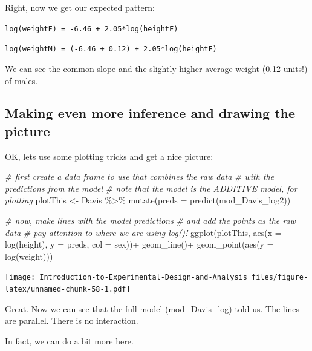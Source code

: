 \documentclass[
]{book}
\newenvironment{Shaded}{\begin{snugshade}}{\end{snugshade}}
\newcommand{\AttributeTok}[1]{\textcolor[rgb]{0.77,0.63,0.00}{#1}}
\newcommand{\CommentTok}[1]{\textcolor[rgb]{0.56,0.35,0.01}{\textit{#1}}}
\newcommand{\FunctionTok}[1]{\textcolor[rgb]{0.00,0.00,0.00}{#1}}
\newcommand{\NormalTok}[1]{#1}
\newcommand{\OtherTok}[1]{\textcolor[rgb]{0.56,0.35,0.01}{#1}}
\newcommand{\SpecialCharTok}[1]{\textcolor[rgb]{0.00,0.00,0.00}{#1}}
\begin{document}
Right, now we get our expected pattern:

\texttt{log(weightF)\ =\ -6.46\ +\ 2.05*log(heightF)}

\texttt{log(weightM)\ =\ (-6.46\ +\ 0.12)\ +\ 2.05*log(heightF)}

We can see the common slope and the slightly higher average weight (0.12 units!) of males.

\hypertarget{making-even-more-inference-and-drawing-the-picture}{%
\subsection{Making even more inference and drawing the picture}\label{making-even-more-inference-and-drawing-the-picture}}

OK, lets use some plotting tricks and get a nice picture:

\begin{Shaded}
\begin{Highlighting}[]
\CommentTok{\# first create a data frame to use that combines the raw data }
\CommentTok{\# with the predictions from the model}
\CommentTok{\# note that the model is the ADDITIVE model, for plotting}
\NormalTok{plotThis }\OtherTok{\textless{}{-}}\NormalTok{ Davis }\SpecialCharTok{\%\textgreater{}\%} 
  \FunctionTok{mutate}\NormalTok{(}\AttributeTok{preds =} \FunctionTok{predict}\NormalTok{(mod\_Davis\_log2))}

\CommentTok{\# now, make lines with the model predictions}
\CommentTok{\# and add the points as the raw data}
\CommentTok{\# pay attention to where we are using log()!}
\FunctionTok{ggplot}\NormalTok{(plotThis, }\FunctionTok{aes}\NormalTok{(}\AttributeTok{x =} \FunctionTok{log}\NormalTok{(height), }\AttributeTok{y =}\NormalTok{ preds, }\AttributeTok{col =}\NormalTok{ sex))}\SpecialCharTok{+}
  \FunctionTok{geom\_line}\NormalTok{()}\SpecialCharTok{+}
  \FunctionTok{geom\_point}\NormalTok{(}\FunctionTok{aes}\NormalTok{(}\AttributeTok{y =} \FunctionTok{log}\NormalTok{(weight)))}
\end{Highlighting}
\end{Shaded}

\texttt{[image: Introduction-to-Experimental-Design-and-Analysis\_files/figure-latex/unnamed-chunk-58-1.pdf]}

Great. Now we can see that the full model (mod\_Davis\_log) told us. The lines are parallel. There is no interaction.

In fact, we can do a bit more here.
\end{document}
